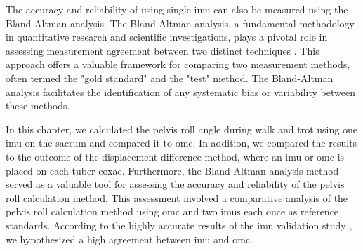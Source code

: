 The accuracy and reliability of using single \gls{imu} can also be measured using the Bland-Altman analysis. The Bland-Altman analysis, a fundamental methodology in quantitative research and scientific investigations, plays a pivotal role in assessing measurement agreement between two distinct techniques \cite{blandaltman}. This approach offers a valuable framework for comparing two measurement methods, often termed the "gold standard" and the "test" method. The Bland-Altman analysis facilitates the identification of any systematic bias or variability between these methods. 

In this chapter, we calculated the pelvis roll angle during walk and trot using one \gls{imu} on the sacrum and compared it to \gls{omc}. In addition, we compared the results to the outcome of the displacement difference method, where an \gls{imu} or \gls{omc} is placed on each tuber coxae. 
Furthermore, the Bland-Altman analysis method served as a valuable tool for assessing the accuracy and reliability of the pelvis roll calculation method. This assessment involved a comparative analysis of the pelvis roll calculation method using \gls{omc} and two \gls{imu}s each once as reference standards. According to the highly accurate results of the \gls{imu} validation study \cite{456}, we hypothesized a high agreement between \gls{imu} and \gls{omc}.
